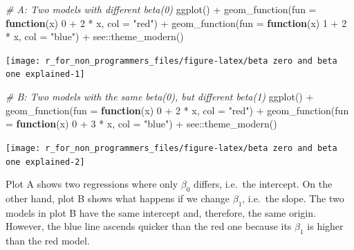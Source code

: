 \documentclass[
]{book}
\newenvironment{Shaded}{\begin{snugshade}}{\end{snugshade}}
\newcommand{\AttributeTok}[1]{\textcolor[rgb]{0.77,0.63,0.00}{#1}}
\newcommand{\CommentTok}[1]{\textcolor[rgb]{0.56,0.35,0.01}{\textit{#1}}}
\newcommand{\ControlFlowTok}[1]{\textcolor[rgb]{0.13,0.29,0.53}{\textbf{#1}}}
\newcommand{\DecValTok}[1]{\textcolor[rgb]{0.00,0.00,0.81}{#1}}
\newcommand{\FunctionTok}[1]{\textcolor[rgb]{0.00,0.00,0.00}{#1}}
\newcommand{\NormalTok}[1]{#1}
\newcommand{\SpecialCharTok}[1]{\textcolor[rgb]{0.00,0.00,0.00}{#1}}
\newcommand{\StringTok}[1]{\textcolor[rgb]{0.31,0.60,0.02}{#1}}
\begin{document}
\begin{Shaded}
\begin{Highlighting}[]
\CommentTok{\# A: Two models with different beta(0)}
\FunctionTok{ggplot}\NormalTok{() }\SpecialCharTok{+}
  \FunctionTok{geom\_function}\NormalTok{(}\AttributeTok{fun =} \ControlFlowTok{function}\NormalTok{(x) }\DecValTok{0} \SpecialCharTok{+} \DecValTok{2} \SpecialCharTok{*}\NormalTok{ x, }\AttributeTok{col =} \StringTok{"red"}\NormalTok{) }\SpecialCharTok{+}
  \FunctionTok{geom\_function}\NormalTok{(}\AttributeTok{fun =} \ControlFlowTok{function}\NormalTok{(x) }\DecValTok{1} \SpecialCharTok{+} \DecValTok{2} \SpecialCharTok{*}\NormalTok{ x, }\AttributeTok{col =} \StringTok{"blue"}\NormalTok{) }\SpecialCharTok{+}
\NormalTok{  see}\SpecialCharTok{::}\FunctionTok{theme\_modern}\NormalTok{()}
\end{Highlighting}
\end{Shaded}

\begin{center}\texttt{[image: r\_for\_non\_programmers\_files/figure-latex/beta zero and beta one explained-1]} \end{center}

\begin{Shaded}
\begin{Highlighting}[]
\CommentTok{\# B: Two models with the same beta(0), but different beta(1)}
\FunctionTok{ggplot}\NormalTok{() }\SpecialCharTok{+}
  \FunctionTok{geom\_function}\NormalTok{(}\AttributeTok{fun =} \ControlFlowTok{function}\NormalTok{(x) }\DecValTok{0} \SpecialCharTok{+} \DecValTok{2} \SpecialCharTok{*}\NormalTok{ x, }\AttributeTok{col =} \StringTok{"red"}\NormalTok{) }\SpecialCharTok{+}
  \FunctionTok{geom\_function}\NormalTok{(}\AttributeTok{fun =} \ControlFlowTok{function}\NormalTok{(x) }\DecValTok{0} \SpecialCharTok{+} \DecValTok{3} \SpecialCharTok{*}\NormalTok{ x, }\AttributeTok{col =} \StringTok{"blue"}\NormalTok{) }\SpecialCharTok{+}
\NormalTok{  see}\SpecialCharTok{::}\FunctionTok{theme\_modern}\NormalTok{()}
\end{Highlighting}
\end{Shaded}

\begin{center}\texttt{[image: r\_for\_non\_programmers\_files/figure-latex/beta zero and beta one explained-2]} \end{center}

Plot A shows two regressions where only \(\beta_0\) differs, i.e.~the intercept. On the other hand, plot B shows what happens if we change \(\beta_1\), i.e.~the slope. The two models in plot B have the same intercept and, therefore, the same origin. However, the blue line ascends quicker than the red one because its \(\beta_1\) is higher than the red model.
\end{document}
